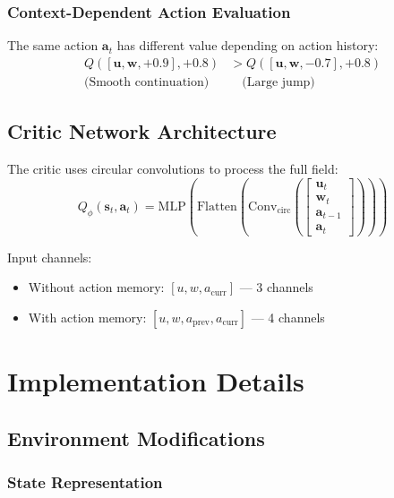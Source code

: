 \documentclass[11pt,a4paper]{article}
\theoremstyle{definition}
\begin{document}
\subsubsection{Context-Dependent Action Evaluation}

The same action $\mathbf{a}_t$ has different value depending on action history:
\begin{align}
    Q([\mathbf{u}, \mathbf{w}, +0.9], +0.8) &> Q([\mathbf{u}, \mathbf{w}, -0.7], +0.8) \\
    \text{(Smooth continuation)} & \quad \text{(Large jump)}
\end{align}

\subsection{Critic Network Architecture}

The critic uses circular convolutions to process the full field:
\begin{equation}
    Q_\phi(\mathbf{s}_t, \mathbf{a}_t) = \text{MLP}\left(\text{Flatten}\left(\text{Conv}_{\text{circ}}\left(\begin{bmatrix}
        \mathbf{u}_t \\
        \mathbf{w}_t \\
        \mathbf{a}_{t-1} \\
        \mathbf{a}_t
    \end{bmatrix}\right)\right)\right)
\end{equation}

Input channels:
\begin{itemize}
    \item Without action memory: $[u, w, a_{\text{curr}}]$ — 3 channels
    \item With action memory: $[u, w, a_{\text{prev}}, a_{\text{curr}}]$ — 4 channels
\end{itemize}

\section{Implementation Details}

\subsection{Environment Modifications}

\subsubsection{State Representation}
\end{document}
